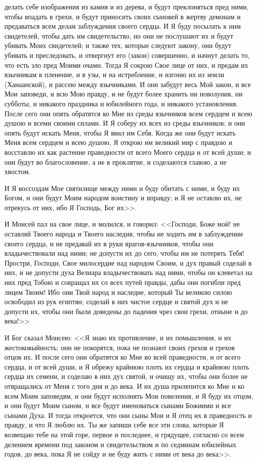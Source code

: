 делать себе изображения из камня и из дерева, и будут преклоняться пред ними,
чтобы впадать в грехи, и будут приносить своих сыновей в жертву демонам и
предаваться всем делам заблуждения своего сердца. И Я буду посылать к
ним свидетелей, чтобы дать им свидетельство, но они не послушают их и будут
убивать Моих свидетелей; и также тех, которые следуют закону, они будут убивать
и преследовать, и отвергнут его (закон) совершенно, и начнут делать то, что
есть зло пред Моими очами. Тогда Я сокрою Свое лице от них, и предам их
язычникам в пленение, и в узы, и на истребление, и изгоню их из земли
(Ханаанской), и рассею между язычниками. И они забудут весь Мой закон, и
все Мои заповеди, и всю Мою правду, и не будут более хранить ни новолуния, ни
субботы, и никакого праздника и юбилейного года, и никакого установления. После
сего они опять обратятся ко Мне из среды язычников всем сердцем и всею
душою и всеми своими силами. И Я соберу их всех из среды язычников; и они опять
будут искать Меня, чтобы Я явил им Себя. Когда же они будут искать Меня всем
сердцем и всею душою, Я открою им великий мир с правдою и восставлю их как
растение праведности от всего Моего сердца и от всей души; и они будут
во благословение, а не в проклятие, и соделаются главою, а не хвостом.

И Я воссоздам Мое святилище между ними и буду обитать с ними, и буду их
Богом, и они будут Моим народом воистину и вправду; и Я не оставлю их, не
отрекусь от них, ибо Я Господь, Бог их>>.

И Моисей пал на свое лице, и молился, и говорил: <<Господи, Боже мой! не
оставляй Твоего народа и Твоего наследия, чтобы не ходить им в заблуждении
своего сердца, и не предавай их в руки врагов-язычников, чтобы они
владычествовали над ними; не допусти их до сего, чтобы им не потерять Тебя!
Простри, Господи, Свое милосердие над народом Своим, и дух правый соделай в
них, и не допусти духа Велиара владычествовать над ними, чтобы он
клеветал на них пред Тобою и совращал их со всех путей правды, дабы они
погибли пред лицем Твоим! Ибо они Твой народ и наследие, который Ты великою
силою освободил из рук египтян; соделай в них чистое сердце и святой дух и не
допусти их, чтобы они были доведены до падения чрез свои грехи, отныне и до
века!>>

И Бог сказал Моисею: <<Я знаю их противление, и их помышления, и их
жестоковыйность; они не покорятся, пока не познают своих грехов и грехов
отцов их. И после сего они обратятся ко Мне во всей праведности, и от всего
сердца, и от всей души, и Я обрежу крайнюю плоть их сердца и крайнюю плоть
сердца их семени, и соделаю в них дух святой, и очищу их, чтобы они более не
отвращались от Меня с того дня и до века. И их душа прилепится ко Мне и ко всем
Моим заповедям, и они будут исполнять Мои повеления, и Я буду их отцом, и они
будут Моим сыном, и все будут именоваться сынами Божиими и все сынами
Духа. И тогда откроется, что они сыны Мои и Я отец их в праведность и
правду, и что Я люблю их. Ты же запиши себе все эти слова, которые Я возвещаю
тебе на этой горе, первое и последнее, и грядущее, согласно со всем делением
времени под законом и свидетельством и по седминам юбилейных годов, до века,
пока Я не сойду и не буду жить с ними от века до века>>.

